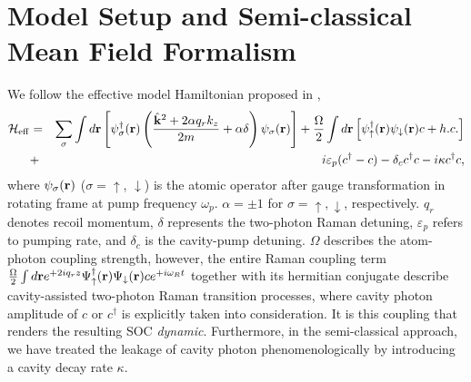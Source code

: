 \documentclass[atoms,article,submit,moreauthors,pdftex,12pt,a4paper]{mdpi}
\def\ba{\begin{eqnarray}}
\def\ea{\end{eqnarray}}
\begin{document}
\section{Model Setup and Semi-classical Mean Field Formalism} \label{meanfield}

We follow the effective model Hamiltonian proposed in \cite{cavitySOC}, 
\ba
 \mathcal{H}_{\rm eff}& = & \sum_\sigma\int d{\bf r}\left[ \psi^\dagger_\sigma({\bf r})\left(\frac{ \hat{{\bf k}}^2+ 2\alpha q_r {k}_z}{2m}+\alpha\delta\right)\psi_\sigma({\bf r})\right]+  \frac{\Omega}{2}\int d{\bf r}\left[{\psi}_{\uparrow}^{\dagger}({\bf r}){\psi}_{\downarrow}({\bf r})c+ h.c. \right]\nonumber \\
 & + & i\varepsilon_{p}(c^{\dagger}-c)-\delta_c c^{\dagger}c-i\kappa c^{\dagger}c, \label{effH}
 \ea
where $\psi_\sigma({\bf r})$ ($\sigma = \uparrow$, $\downarrow$) is the atomic operator after gauge transformation in rotating frame at pump frequency $\omega_p$. $\alpha=\pm 1$ for $\sigma=\uparrow,\downarrow$, respectively. $q_r$ denotes recoil momentum, $\delta$ represents the two-photon Raman detuning, $\varepsilon_p$ refers to pumping rate, and $\delta_c$ is the cavity-pump detuning. $\Omega$ describes the atom-photon coupling strength, however, the entire Raman coupling term $ \frac{\Omega}{2}\int d{\bf r}e^{+2i q_{r}z}\Psi_{\uparrow}^{\dagger}({\bf r})\Psi_{\downarrow}({\bf r})ce^{+i\omega_{R}t}$ together with its hermitian conjugate describe cavity-assisted two-photon Raman transition processes, where cavity photon amplitude of $c$ or $c^\dag$ is explicitly taken into consideration. It is this coupling that renders the resulting SOC \emph{dynamic}. Furthermore, in the semi-classical approach, we have treated the leakage of cavity photon phenomenologically by introducing a cavity decay rate $\kappa$. 
\end{document}
